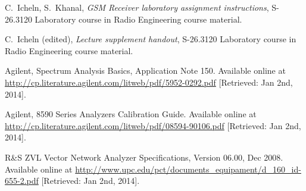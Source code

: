\documentclass[a4paper, 12pt]{article}
\begin{document}
\newpage
\begin{thebibliography}{9}%

 C.\ Icheln, S.\ Khanal, 
	\textit{GSM Receiver laboratory assignment instructions},
	S-26.3120 Laboratory course in Radio Engineering course material.
	
\bibitem{} C.\ Icheln (edited), 
	\textit{Lecture supplement handout},
	S-26.3120 Laboratory course in Radio Engineering course material.

 Agilent, Spectrum Analysis Basics, Application Note 150. 
	Available online at \url{http://cp.literature.agilent.com/litweb/pdf/5952-0292.pdf} 
	[Retrieved: Jan 2nd, 2014].
	
 Agilent, 8590 Series Analyzers Calibration Guide.
	Available online at \url{http://cp.literature.agilent.com/litweb/pdf/08594-90106.pdf}
	[Retrieved: Jan 2nd, 2014].
	
 R\&S ZVL Vector Network Analyzer Specifications, 
	Version 06.00, Dec 2008. 
	Available online at \url{http://www.upc.edu/pct/documents_equipament/d_160_id-655-2.pdf} 
	[Retrieved: Jan 2nd, 2014].


	

	

\end{thebibliography}
\end{document}
